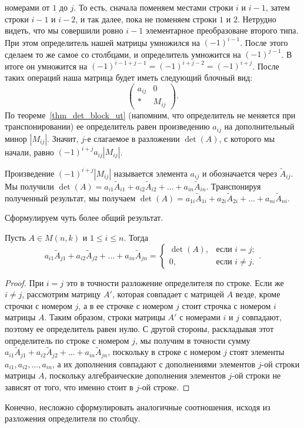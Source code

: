 номерами от $1$ до $j$. То есть, сначала поменяем местами строки $i$ и
$i-1$, затем строки $i-1$ и $i-2$, и так далее, пока не поменяем
строки $1$ и $2$. Нетрудно видеть, что мы совершили ровно $i-1$
элементарное преобразоване второго типа. При этом определитель нашей
матрицы умножился на $(-1)^{i-1}$. После этого сделаем то же самое со
столбцами, и определитель умножится на $(-1)^{j-1}$. В итоге он
умножится на $(-1)^{i-1+j-1}=(-1)^{i+j-2}=(-1)^{i+j}$. После таких
операций наша матрица будет иметь следующий блочный вид:
$$
\begin{pmatrix}a_{ij} & 0\\
* & M_{ij}
\end{pmatrix}.
$$
По теореме~\ref{thm_det_block_ut} (напомним, что определитель не
меняется при транспонировании) ее определитель равен произведению
$a_{ij}$ на дополнительный минор $|M_{ij}|$. Значит, $j$-е слагаемое в
разложении $\det(A)$, с которого мы начали, равно
$(-1)^{i+j}a_{ij}|M_{ij}|$.

Произведение $(-1)^{i+j}|M_{ij}|$ называется
элемента $a_{ij}$ и обозначается
через $\widetilde{A}_{ij}$.
Мы получили 
$\det(A)=a_{i1}\widetilde{A}_{i1} + a_{i2}\widetilde{A}_{i2} + \dots +
a_{in}\widetilde{A}_{in}$.
Транспонируя полученный результат, мы получаем
$\det(A)=a_{1i}\widetilde{A}_{1i} + a_{2i}\widetilde{A}_{2i} + \dots +
a_{ni}\widetilde{A}_{ni}$.

Сформулируем чуть более общий результат.

\begin{theorem}
Пусть $A\in M(n,k)$ и $1\leq i\leq n$. Тогда
$$
a_{i1}\widetilde{A}_{j1} + a_{i2}\widetilde{A}_{j2} + \dots +
a_{in}\widetilde{A}_{jn} =
\begin{cases}
\det(A),&\text{если }i=j;\\
0,&\text{если }i\neq j.
\end{cases}.
$$
\end{theorem}
\begin{proof}
При $i=j$ это в точности разложение определителя по строке. Если же
$i\neq j$, рассмотрим матрицу $A'$, которая совпадает с матрицей $A$
везде, кроме строчки с номером $j$, а в ее строчке с номером $j$ стоит
строчка с номером $i$ матрицы $A$. Таким образом, строки матрицы $A'$
с номерами $i$ и $j$ совпадают, поэтому ее определитель равен нулю. С
другой стороны, раскладывая этот определитель по строке с номером $j$,
мы получим в
точности сумму $a_{i1}\widetilde{A}_{j1} + a_{i2}\widetilde{A}_{j2} + \dots +
a_{in}\widetilde{A}_{jn}$, поскольку в строке с номером $j$ стоят
элементы $a_{i1},a_{i2},\dots,a_{in}$, а их дополнения совпадают с
дополнениями элементов $j$-ой строки матрицы $A$, поскольку
алгебраические дополнения элементов $j$-ой строки не зависят от того,
что именно стоит в $j$-ой строке.
\end{proof}
Конечно, несложно сформулировать аналогичные соотношения, исходя из
разложения определителя по столбцу.

